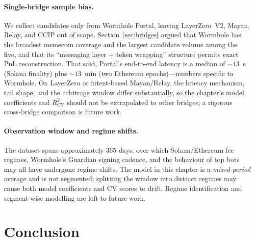 \documentclass[sigconf,nonacm,10pt]{acmart}
\begin{document}
\paragraph{Single-bridge sample bias.} We collect candidates only
from Wormhole Portal, leaving LayerZero~V2, Mayan, Relay, and CCIP
out of scope.
Section~\ref{sec:bridges} argued that Wormhole has the broadest
memecoin coverage and the largest candidate volume among the five,
and that its ``messaging layer $+$ token wrapping'' structure permits
exact PnL reconstruction. That said, Portal's end-to-end latency
is a median of $\sim\!13$~s (Solana finality) plus $\sim\!13$~min
(two Ethereum epochs)---numbers specific to Wormhole. On LayerZero or
intent-based Mayan/Relay, the latency mechanism, tail shape, and the
arbitrage window differ substantially, so the chapter's model
coefficients and $R^2_{\text{CV}}$ should not be extrapolated to
other bridges; a rigorous cross-bridge comparison is future work.

\paragraph{Observation window and regime shifts.} The dataset spans
approximately $365$ days, over which Solana/Ethereum fee regimes,
Wormhole's Guardian signing cadence, and the behaviour of top bots
may all have undergone regime shifts. The model in this chapter is
a \emph{mixed-period} average and is not segmented; splitting the
window into distinct regimes may cause both model coefficients and
CV scores to drift. Regime identification and segment-wise modelling
are left to future work.

\section{Conclusion}
\label{sec:conclusion}
\end{document}
